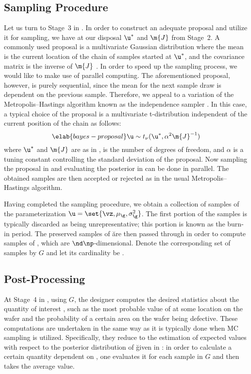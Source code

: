 \subsection{Sampling Procedure}

Let us turn to Stage~3 in . In order to construct an
adequate proposal and utilize it for sampling, we have at our disposal $\u^*$
and $\m{J}$ from Stage~2. A commonly used proposal is a multivariate Gaussian
distribution where the mean is the current location of the chain of samples
started at $\u^*$, and the covariance matrix is the inverse of $\m{J}$
\cite{gelman2013}. In order to speed up the sampling process, we would like to
make use of parallel computing. The aforementioned proposal, however, is purely
sequential, since the mean for the next sample draw is dependent on the previous
sample. Therefore, we appeal to a variation of the Metropolis--Hastings
algorithm known as the independence sampler \cite{gelman2013}. In this case, a
typical choice of the proposal is a multivariate t-distribution independent of
the current position of the chain as follows:
\begin{equation} \elab{bayes-proposal}
  \u \sim t_\nu(\u^*, \alpha^2 \m{J}^{-1})
\end{equation}
where $\u^*$ and $\m{J}$ are as in , \nu is the number
of degrees of freedom, and $\alpha$ is a tuning constant controlling the
standard deviation of the proposal. Now sampling the proposal in
 and evaluating the posterior in  can
be done in parallel. The obtained samples are then accepted or rejected as in
the usual Metropolis--Hastings algorithm.

Having completed the sampling procedure, we obtain a collection of samples of
the parameterization $\u = \set{\vz, \mu_\g, \sigma^2_\g}$. The first portion of
the samples is typically discarded as being unrepresentative; this portion is
known as the burn-in period. The preserved samples of \u are then passed through
 in order to compute samples of \g, which are $\nd
\np$-dimensional. Denote the corresponding set of samples by $G$ and let its
cardinality be \no.

\subsection{Post-Processing}

At Stage~4 in , using $G$, the designer computes the
desired statistics about the quantity of interest \g, such as the most probable
value of \g at some location on the wafer and the probability of a certain area
on the wafer being defective. These computations are undertaken in the same way
as it is typically done when \ac{MC} sampling is utilized. Specifically, they
reduce to the estimation of expected values with respect to the posterior
distribution of \u given in : in order to calculate a
certain quantity dependent on \g, one evaluates it for each sample in $G$ and
then takes the average value.

